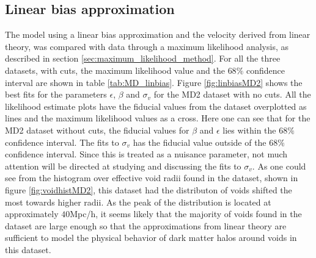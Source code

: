 \subsection{Linear bias approximation}
The model using a linear bias approximation and the velocity derived from linear theory, was compared with data through a maximum likelihood analysis, as described in section \ref{sec:maximum_likelihood_method}. For all the three datasets, with cuts, the maximum likelihood value and the $68\%$ confidence interval are shown in table \ref{tab:MD_linbias}. Figure \ref{fig:linbiasMD2} shows the best fits for the parameters $\epsilon$, $\beta$ and $\sigma_v$ for the MD2 dataset with no cuts. All the likelihood estimate plots have the fiducial values from the dataset overplotted as lines and the maximum likelihood values as a cross. Here one can see that for the MD2 dataset without cuts, the fiducial values for $\beta$ and $\epsilon$ lies within the $68\%$ confidence interval. The fits to $\sigma_v$ has the fiducial value outside of the $68\%$ confidence interval. Since this is treated as a nuisance parameter, not much attention will be directed at studying and discussing the fits to $\sigma_v$. As one could see from the histogram over effective void radii found in the dataset, shown in figure \ref{fig:voidhistMD2}, this dataset had the distributon of voids shifted the most towards higher radii. As the peak of the distribution is located at approximately $40$Mpc/h, it seems likely that the majority of voids found in the dataset are large enough so that the approximations from linear theory are sufficient to model the physical behavior of dark matter halos around voids in this dataset.\\\indent
